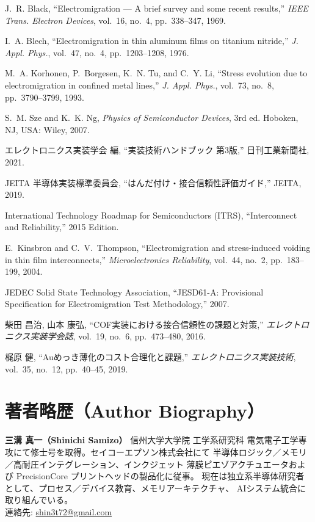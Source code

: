 \documentclass[conference]{IEEEtran}
\begin{document}
\balance

\begin{thebibliography}{99}

J.~R. Black, ``Electromigration --- A brief survey and some recent results,''
\emph{IEEE Trans. Electron Devices}, vol.~16, no.~4, pp.~338--347, 1969.

I.~A. Blech, ``Electromigration in thin aluminum films on titanium nitride,''
\emph{J. Appl. Phys.}, vol.~47, no.~4, pp.~1203--1208, 1976.

M.~A. Korhonen, P.~Borgesen, K.~N. Tu, and C.~Y. Li,
``Stress evolution due to electromigration in confined metal lines,''
\emph{J. Appl. Phys.}, vol.~73, no.~8, pp.~3790--3799, 1993.

S.~M. Sze and K.~K. Ng, \emph{Physics of Semiconductor Devices}, 3rd ed.
Hoboken, NJ, USA: Wiley, 2007.

エレクトロニクス実装学会 編, 
``実装技術ハンドブック 第3版,'' 日刊工業新聞社, 2021.

JEITA 半導体実装標準委員会, 
``はんだ付け・接合信頼性評価ガイド,'' JEITA, 2019.

International Technology Roadmap for Semiconductors (ITRS), 
``Interconnect and Reliability,'' 2015 Edition.

E.~Kinsbron and C.~V.~Thompson, 
``Electromigration and stress-induced voiding in thin film interconnects,''
\emph{Microelectronics Reliability}, vol.~44, no.~2, pp.~183--199, 2004.

JEDEC Solid State Technology Association, 
``JESD61-A: Provisional Specification for Electromigration Test Methodology,'' 2007.

柴田 昌治, 山本 康弘, 
``COF実装における接合信頼性の課題と対策,''
\emph{エレクトロニクス実装学会誌}, vol.~19, no.~6, pp.~473--480, 2016.

梶原 健, ``Auめっき薄化のコスト合理化と課題,'' 
\emph{エレクトロニクス実装技術}, vol.~35, no.~12, pp.~40--45, 2019.

\end{thebibliography}

\section*{著者略歴（Author Biography）}
\textbf{三溝 真一（Shinichi Samizo）} 信州大学大学院 工学系研究科
電気電子工学専攻にて修士号を取得。セイコーエプソン株式会社にて
半導体ロジック／メモリ／高耐圧インテグレーション、インクジェット
薄膜ピエゾアクチュエータおよび PrecisionCore プリントヘッドの製品化に従事。
現在は独立系半導体研究者として、プロセス／デバイス教育、メモリアーキテクチャ、
AIシステム統合に取り組んでいる。\\
連絡先: \href{mailto:shin3t72@gmail.com}{shin3t72@gmail.com}
\end{document}
